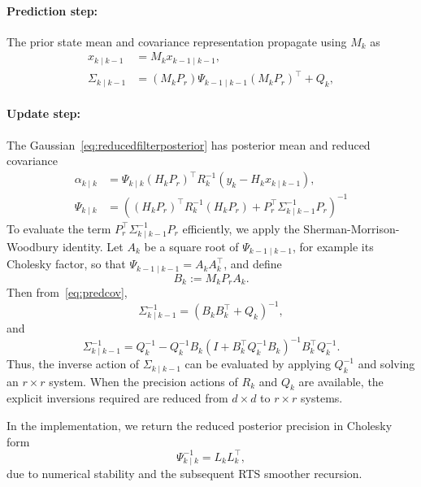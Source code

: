 \documentclass[a4paper,12pt]{article}
\begin{document}
\paragraph{Prediction step:}
The prior state mean and covariance representation propagate using $M_k$ as
\begin{align}
    x_{k \mid k-1} &= M_{k} x_{k-1 \mid k-1},\\
    \Sigma_{k \mid k-1} &= (M_{k} P_r) \Psi_{k-1 \mid k-1} (M_{k} P_r)^{\top} + Q_{k},\label{eq:predcov}
\end{align}

\paragraph{Update step:}
The Gaussian~\eqref{eq:reducedfilterposterior} has posterior mean and reduced covariance
\begin{align}\label{eq:updatestep}
    \alpha_{k \mid k} &= \Psi_{k \mid k} (H_k P_r)^{\top}
                         R_{k}^{-1} (y_k - H_k x_{k \mid k-1}),\\
    \Psi_{k \mid k}   &= \left(
                            (H_k P_r)^{\top} R_{k}^{-1} (H_k P_r)
                            + P_{r}^{\top} \Sigma_{k \mid k-1}^{-1} P_r
                         \right)^{-1}\label{eq:psiupdate}
\end{align}
To evaluate the term $P_{r}^{\top} \Sigma_{k \mid k-1}^{-1} P_r$ efficiently, we apply the Sherman-Morrison-Woodbury identity.
Let $A_k$ be a square root of $\Psi_{k-1 \mid k-1}$, for example its Cholesky factor, so that $\Psi_{k-1 \mid k-1} = A_{k} A_{k}^{\top}$, and define
\begin{equation}
    B_k := M_k P_r A_k.
\end{equation}
Then from~\eqref{eq:predcov},
\begin{equation}
    \Sigma_{k \mid k-1}^{-1} = (B_k B_k^{\top} + Q_k)^{-1},
\end{equation}
and
\begin{equation}
    \Sigma_{k \mid k-1}^{-1} = Q_{k}^{-1}
    - Q_{k}^{-1} B_k
    (I + B_{k}^{\top} Q_{k}^{-1} B_k)^{-1}
    B_{k}^{\top} Q_{k}^{-1}.
\end{equation}
Thus, the inverse action of $\Sigma_{k \mid k-1}$ can be evaluated by applying $Q_{k}^{-1}$ and solving an $r \times r$ system.
When the precision actions of $R_k$ and $Q_k$ are available, the explicit inversions required are reduced from $d \times d$ to $r \times r$ systems.

In the implementation, we return the reduced posterior precision in Cholesky form
\begin{equation}
    \Psi_{k \mid k}^{-1} = L_k L_{k}^{\top},
\end{equation}
due to numerical stability and the subsequent RTS smoother recursion.
\end{document}
